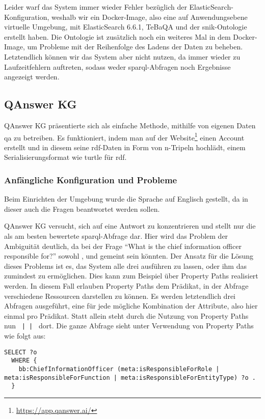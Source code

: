Leider warf das System immer wieder Fehler bezüglich der ElasticSearch-Konfiguration, weshalb wir ein Docker-Image,
also eine auf Anwendungsebene virtuelle Umgebung, mit ElasticSearch 6.6.1, TeBaQA und der \ac{snik}-Ontologie erstellt haben.
Die Ontologie ist zusätzlich noch ein weiteres Mal in dem Docker-Image, um Probleme mit der Reihenfolge des Ladens der Daten zu beheben.
Letztendlich können wir das System aber nicht nutzen, da immer wieder zu Laufzeitfehlern auftreten,
sodass weder \ac{sparql}-Abfragen noch Ergebnisse angezeigt werden.

\subsection{QAnswer KG}

QAnswer KG präsentierte sich als einfache Methode, mithilfe von eigenen Daten \acl{qa} zu betreiben.
Es funktioniert, indem man auf der Website\footnote{\url{https://app.qanswer.ai/}} einen Account erstellt und in diesem seine \ac{rdf}-Daten in Form von n-Tripeln hochlädt,
einem Serialisierungsformat wie \ac{turtle} für \ac{rdf}.

\subsubsection{Anfängliche Konfiguration und Probleme}

Beim Einrichten der Umgebung wurde die Sprache auf Englisch gestellt, da in dieser auch die Fragen beantwortet werden sollen.

QAnswer KG versucht, sich auf eine Antwort zu konzentrieren und stellt nur die als am besten bewertete \ac{sparql}-Abfrage dar.
Hier wird das Problem der Ambiguität deutlich, da bei der Frage \enquote{What is the chief information officer responsible for?} sowohl
,  und  gemeint sein könnten.
Der Ansatz für die Lösung dieses Problems ist es, das System alle drei ausführen zu lassen, oder ihm das zumindest zu ermöglichen.
Dies kann zum Beispiel über Property Paths realisiert werden.
In diesem Fall erlauben Property Paths dem Prädikat, in der Abfrage verschiedene Ressourcen darstellen zu können.
Es werden letztendlich drei Abfragen ausgeführt, eine für jede mögliche Kombination der Attribute, also hier einmal pro Prädikat.
Statt allein \texttt{} steht durch die Nutzung von Property Paths nun \texttt{ |  | } dort.
Die ganze Abfrage sieht unter Verwendung von Property Paths wie folgt aus:
\begin{lstlisting}[language=SPARQL]
  SELECT ?o
  WHERE {
    bb:ChiefInformationOfficer (meta:isResponsibleForRole | meta:isResponsibleForFunction | meta:isResponsibleForEntityType) ?o .
  }
\end{lstlisting}

